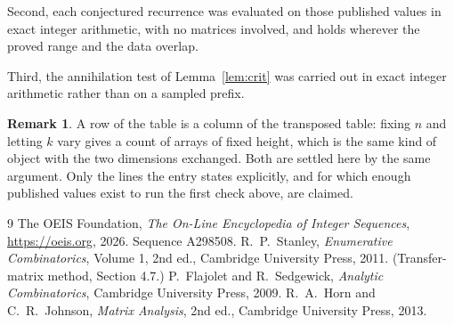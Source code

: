 \documentclass[11pt,a4paper]{article}
\theoremstyle{plain}
\theoremstyle{definition}
\newtheorem{remark}[theorem]{Remark}
\begin{document}
Second, each conjectured recurrence was evaluated on those published values in exact
integer arithmetic, with no matrices involved, and holds wherever the proved range and the
data overlap.

Third, the annihilation test of Lemma~\ref{lem:crit} was carried out in exact integer
arithmetic rather than on a sampled prefix.

\begin{remark}
A row of the table is a column of the transposed table: fixing $n$ and letting $k$ vary gives a
count of arrays of fixed height, which is the same kind of object with the two dimensions
exchanged. Both are settled here by the same argument. Only the lines the entry states
explicitly, and for which enough published values exist to run the first check above, are
claimed.
\end{remark}

\begin{thebibliography}{9}
 The OEIS Foundation, \emph{The On-Line Encyclopedia of Integer
Sequences}, \url{https://oeis.org}, 2026. Sequence A298508.
 R.~P.~Stanley, \emph{Enumerative Combinatorics}, Volume 1, 2nd ed.,
Cambridge University Press, 2011. (Transfer-matrix method, Section 4.7.)
 P.~Flajolet and R.~Sedgewick, \emph{Analytic Combinatorics}, Cambridge
University Press, 2009.
 R.~A.~Horn and C.~R.~Johnson, \emph{Matrix Analysis}, 2nd ed., Cambridge
University Press, 2013.
\end{thebibliography}
\end{document}
